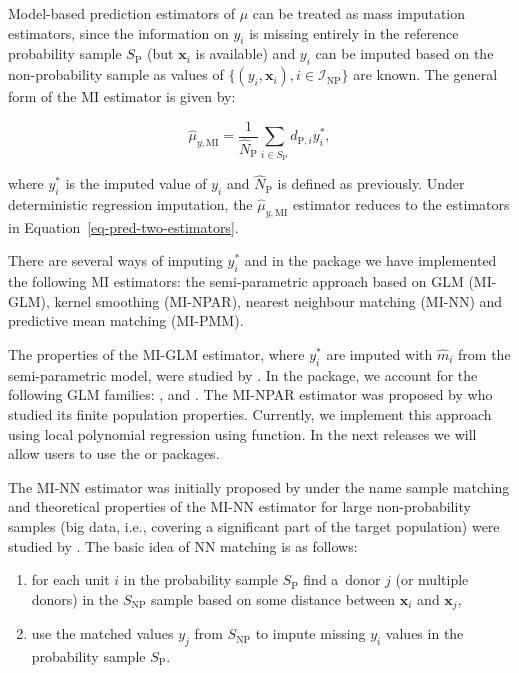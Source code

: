 \documentclass[nojss]{jss}
\begin{document}
Model-based prediction estimators of \(\mu\) can be treated as mass
imputation estimators, since the information on \(y_i\) is missing
entirely in the reference probability sample \(S_{\text{P}}\) (but
\(\boldsymbol{x}_i\) is available) and \(y_i\) can be imputed based on
the non-probability sample as values of
\(\{ (y_i, \boldsymbol{x}_i), i \in \mathcal{I}_{\text{NP}}\}\) are
known. The general form of the MI estimator is given by:

\begin{equation}
\hat{\mu}_{y,\text{MI}}=\frac{1}{\hat{N}_{\text{P}}} \sum_{i \in S_{\text{P}}} d_{\text{P},i} y_i^*, 
\end{equation}

where \(y_i^*\) is the imputed value of \(y_i\) and
\(\hat{N}_{\text{P}}\) is defined as previously. Under deterministic
regression imputation, the \(\hat{\mu}_{y,\text{MI}}\) estimator reduces
to the estimators in Equation~\ref{eq-pred-two-estimators}.

There are several ways of imputing \(y_i^*\) and in the 
package we have implemented the following MI estimators: the
semi-parametric approach based on GLM (MI-GLM), kernel smoothing
(MI-NPAR), nearest neighbour matching (MI-NN) and predictive mean
matching (MI-PMM).

The properties of the MI-GLM estimator, where \(y_i^*\) are imputed with
\(\hat{m}_i\) from the semi-parametric model, were studied by
\citet{kim_combining_2021}. In the  package, we account
for the following GLM families: ,  and
. The MI-NPAR estimator was proposed by
\citet{chen_nonparametric_2022} who studied its finite population
properties. Currently, we implement this approach using local polynomial
regression using  function. In the next releases we
will allow users to use the  \citep{nppkg} or 
\citep{KernSmooth} packages.

The MI-NN estimator was initially proposed by \citet{rivers2007sampling}
under the name sample matching and theoretical properties of the MI-NN
estimator for large non-probability samples (big data, i.e., covering a
significant part of the target population) were studied by
\citet{yang2021integration}. The basic idea of NN matching is as
follows:

\begin{enumerate}
\item for each unit $i$ in the probability sample $S_{\text{P}}$ find a~donor $j$ (or multiple donors) in the $S_{\text{NP}}$ sample based on some distance between $\boldsymbol{x}_i$ and $\boldsymbol{x}_j$,
\item use the matched values $y_j$ from $S_{\text{NP}}$ to impute missing $y_i$ values in the probability sample $S_{\text{P}}$. 
\end{enumerate}
\end{document}
